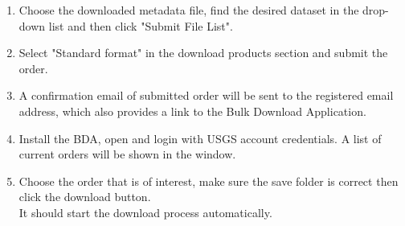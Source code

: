 \begin{enumerate}
\item
Choose the downloaded metadata file, find the desired dataset in the drop-down list and then click "Submit File List".
\item
Select "Standard format" in the download products section and submit the order.
\item
A confirmation email of submitted order will be sent to the registered email address, which also provides a link to the Bulk Download Application.
\item
Install the BDA, open and login with USGS account credentials. A list of current orders will be shown in the window.
\item
Choose the order that is of interest, make sure the save folder is correct then click the download button.\\
It should start the download process automatically.
\end{enumerate}
